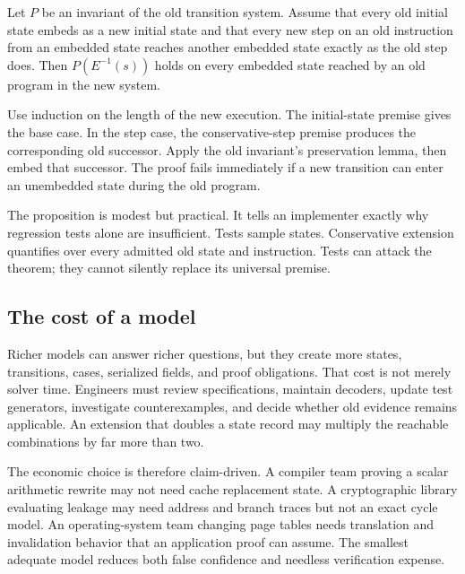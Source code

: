 \begin{proofkit}[title={Proposition: transport of an old invariant}]
Let \(P\) be an invariant of the old transition system. Assume that every old
initial state embeds as a new initial state and that every new step on an old
instruction from an embedded state reaches another embedded state exactly as
the old step does. Then \(P(E^{-1}(s))\) holds on every embedded state reached
by an old program in the new system.
\end{proofkit}

\begin{proofkit}[title={Reader proof}]
Use induction on the length of the new execution. The initial-state premise
gives the base case. In the step case, the conservative-step premise produces
the corresponding old successor. Apply the old invariant's preservation
lemma, then embed that successor. The proof fails immediately if a new
transition can enter an unembedded state during the old program.
\end{proofkit}

The proposition is modest but practical. It tells an implementer exactly why
regression tests alone are insufficient. Tests sample states. Conservative
extension quantifies over every admitted old state and instruction. Tests can
attack the theorem; they cannot silently replace its universal premise.

\subsection{The cost of a model}

Richer models can answer richer questions, but they create more states,
transitions, cases, serialized fields, and proof obligations. That cost is not
merely solver time. Engineers must review specifications, maintain decoders,
update test generators, investigate counterexamples, and decide whether old
evidence remains applicable. An extension that doubles a state record may
multiply the reachable combinations by far more than two.

The economic choice is therefore claim-driven. A compiler team proving a
scalar arithmetic rewrite may not need cache replacement state. A
cryptographic library evaluating leakage may need address and branch traces
but not an exact cycle model. An operating-system team changing page tables
needs translation and invalidation behavior that an application proof can
assume. The smallest adequate model reduces both false confidence and needless
verification expense.

